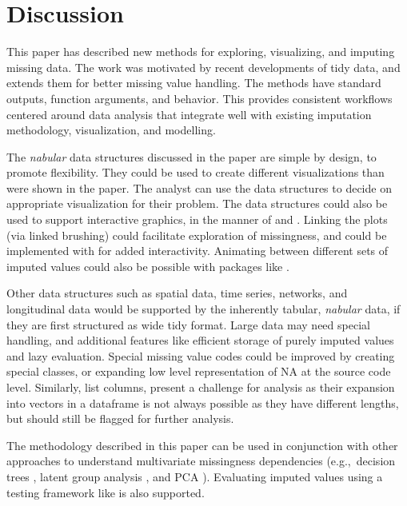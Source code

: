 \documentclass[article]{jss}
\begin{document}
\hypertarget{discussion}{%
\section{Discussion}\label{discussion}}

This paper has described new methods for exploring, visualizing, and
imputing missing data.  The work was motivated by recent developments of
tidy data, and extends them for better missing value handling.  The methods
have standard outputs, function arguments, and behavior.  This provides
consistent workflows centered around data analysis that integrate well with
existing imputation methodology, visualization, and modelling.

The \emph{nabular} data structures discussed in the paper are simple by
design, to promote flexibility.  They could be used to create different
visualizations than were shown in the paper.  The analyst can use the data
structures to decide on appropriate visualization for their problem.  The
data structures could also be used to support interactive graphics, in the
manner of  and .  Linking the plots (via
linked brushing) could facilitate exploration of missingness, and could be
implemented with  \citep{plotly} for added interactivity.
Animating between different sets of imputed values could also be possible
with packages like  \citep{gganimate}.

Other data structures such as spatial data, time series, networks, and
longitudinal data would be supported by the inherently tabular,
\emph{nabular} data, if they are first structured as wide tidy format.
Large data may need special handling, and additional features like efficient
storage of purely imputed values and lazy evaluation.  Special missing value
codes could be improved by creating special classes, or expanding low level
representation of NA at the source code level.  Similarly, list
columns, present a challenge for analysis as their expansion into vectors in
a dataframe is not always possible as they have different lengths, but
should still be flagged for further analysis.

The methodology described in this paper can be used in conjunction with
other approaches to understand multivariate missingness dependencies (e.g.,~decision
trees \citep{Tierney2015}, latent group analysis
\citep{Barnett2017}, and PCA \citep{FactoMineR}).  Evaluating imputed values
using a testing framework like \citep{vanBuuren2018} is also supported.
\end{document}

